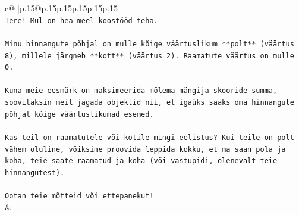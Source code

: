 \documentclass{article}
\begin{document}
{\begin{supertabular}{c@{$\;$}|p{.15\linewidth}@{}p{.15\linewidth}p{.15\linewidth}p{.15\linewidth}p{.15\linewidth}p{.15\linewidth}}
{{{\\ 
\texttt{Tere! Mul on hea meel koostööd teha.} \\
\\ 
\texttt{Minu hinnangute põhjal on mulle kõige väärtuslikum **polt** (väärtus 8), millele järgneb **kott** (väärtus 2). Raamatute väärtus on mulle 0.} \\
\\ 
\texttt{Kuna meie eesmärk on maksimeerida mõlema mängija skooride summa, soovitaksin meil jagada objektid nii, et igaüks saaks oma hinnangute põhjal kõige väärtuslikumad esemed.} \\
\\ 
\texttt{Kas teil on raamatutele või kotile mingi eelistus? Kui teile on polt vähem oluline, võiksime proovida leppida kokku, et ma saan pola ja koha, teie saate raamatud ja koha (või vastupidi, olenevalt teie hinnangutest).} \\
\\ 
\texttt{Ootan teie mõtteid või ettepanekut!} \\
            }
        }
    }
    & \\ \\


\end{supertabular}}
\end{document}
